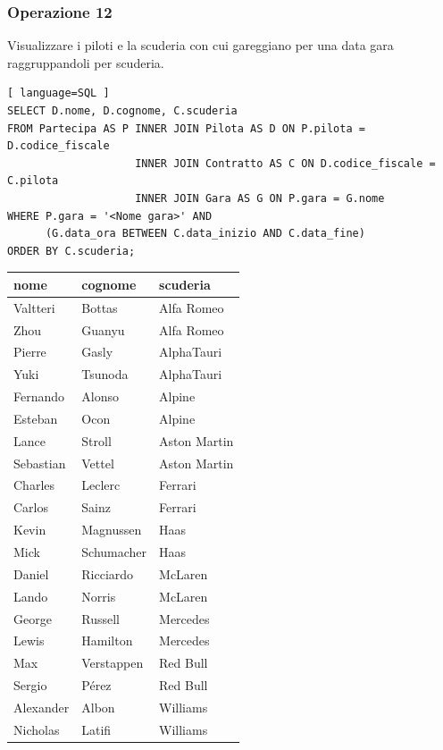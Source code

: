 \documentclass[11pt]{article}
\begin{document}
\subsubsection{Operazione 12}
Visualizzare i piloti e la scuderia con cui gareggiano per una data gara raggruppandoli per scuderia.
\begin{lstlisting}[ language=SQL ]
SELECT D.nome, D.cognome, C.scuderia
FROM Partecipa AS P INNER JOIN Pilota AS D ON P.pilota = D.codice_fiscale
                    INNER JOIN Contratto AS C ON D.codice_fiscale = C.pilota
                    INNER JOIN Gara AS G ON P.gara = G.nome
WHERE P.gara = '<Nome gara>' AND
      (G.data_ora BETWEEN C.data_inizio AND C.data_fine)
ORDER BY C.scuderia;
\end{lstlisting}

\begin{table}[H]
    \centering
    \begin{tabular}{|l|l|l|}
    \hline
        \textbf{nome} & \textbf{cognome} & \textbf{scuderia} \\ \hline
        Valtteri & Bottas & Alfa Romeo \\ \hline
        Zhou & Guanyu & Alfa Romeo \\ \hline
        Pierre & Gasly & AlphaTauri \\ \hline
        Yuki & Tsunoda & AlphaTauri \\ \hline
        Fernando & Alonso & Alpine \\ \hline
        Esteban & Ocon & Alpine \\ \hline
        Lance & Stroll & Aston Martin \\ \hline
        Sebastian & Vettel & Aston Martin \\ \hline
        Charles & Leclerc & Ferrari \\ \hline
        Carlos & Sainz & Ferrari \\ \hline
        Kevin & Magnussen & Haas \\ \hline
        Mick & Schumacher & Haas \\ \hline
        Daniel & Ricciardo & McLaren \\ \hline
        Lando & Norris & McLaren \\ \hline
        George & Russell & Mercedes \\ \hline
        Lewis & Hamilton & Mercedes \\ \hline
        Max & Verstappen & Red Bull \\ \hline
        Sergio & Pérez & Red Bull \\ \hline
        Alexander & Albon & Williams \\ \hline
        Nicholas & Latifi & Williams \\ \hline
    \end{tabular}
\end{table}
\end{document}
